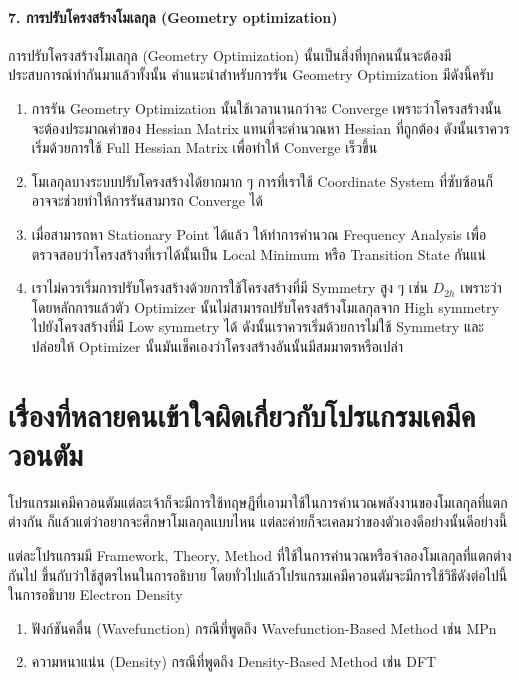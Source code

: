 \paragraph{7. การปรับโครงสร้างโมเลกุล (Geometry optimization)}
การปรับโครงสร้างโมเลกุล (Geometry Optimization) นั้นเป็นสิ่งที่ทุกคนนั้นจะต้องมีประสบการณ์ทำกันมาแล้วทั้งนั้น คำแนะนำสำหรับการรัน
Geometry Optimization มีดังนี้ครับ

\begin{enumerate}
  \item การรัน Geometry Optimization นั้นใช้เวลานานกว่าจะ Converge เพราะว่าโครงสร้างนั้นจะต้องประมาณค่าของ Hessian
        Matrix แทนที่จะคำนวณหา Hessian ที่ถูกต้อง ดังนั้นเราควรเริ่มด้วยการใช้ Full Hessian Matrix เพื่อทำให้ Converge เร็วขึ้น

  \item โมเลกุลบางระบบปรับโครงสร้างได้ยากมาก ๆ การที่เราใช้ Coordinate System ที่ซับซ้อนก็อาจจะช่วยทำให้การรันสามารถ Converge ได้

  \item เมื่อสามารถหา Stationary Point ได้แล้ว ให้ทำการคำนวณ Frequency Analysis เพื่อตรวจสอบว่าโครงสร้างที่เราได้นั้นเป็น
        Local Minimum หรือ Transition State กันแน่

  \item เราไม่ควรเริ่มการปรับโครงสร้างด้วยการใช้โครงสร้างที่มี Symmetry สูง ๆ เช่น $D_{2h}$ เพราะว่าโดยหลักการแล้วตัว Optimizer
        นั้นไม่สามารถปรับโครงสร้างโมเลกุลจาก High symmetry ไปยังโครงสร้างที่มี Low symmetry ได้ ดังนั้นเราควรเริ่มด้วยการไม่ใช้ Symmetry
        และปล่อยให้ Optimizer นั้นมันเช็คเองว่าโครงสร้างอันนั้นมีสมมาตรหรือเปล่า
\end{enumerate}

\section{เรื่องที่หลายคนเข้าใจผิดเกี่ยวกับโปรแกรมเคมีควอนตัม}

โปรแกรมเคมีควอนตัมแต่ละเจ้าก็จะมีการใช้ทฤษฎีที่เอามาใช้ในการคำนวณพลังงานของโมเลกุลที่แตกต่างกัน ก็แล้วแต่ว่าอยากจะศึกษาโมเลกุลแบบไหน
แต่ละค่ายก็จะเคลมว่าของตัวเองดีอย่างนั้นดีอย่างนี้

แต่ละโปรแกรมมี Framework, Theory, Method ที่ใช้ในการคำนวณหรือจำลองโมเลกุลที่แตกต่างกันไป ขึ้นกับว่าใช้สูตรไหนในการอธิบาย
โดยทั่วไปแล้วโปรแกรมเคมีควอนตัมจะมีการใช้วิธีดังต่อไปนี้ในการอธิบาย Electron Density

\begin{enumerate}[topsep=0pt]
  \item ฟังก์ชันคลื่น (Wavefunction) กรณีที่พูดถึง Wavefunction-Based Method เช่น MPn

  \item ความหนาแน่น (Density) กรณีที่พูดถึง Density-Based Method เช่น DFT
\end{enumerate}

